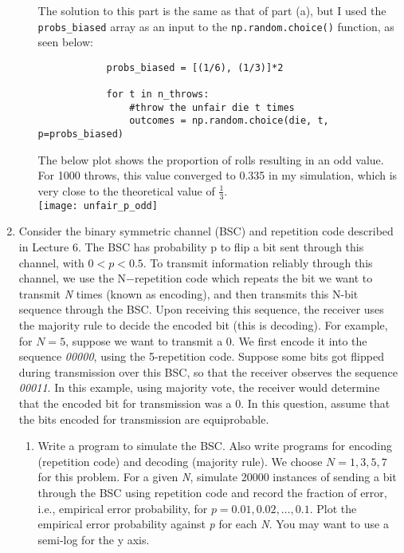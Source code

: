 \documentclass[]{article}
\begin{document}
\begin{enumerate}
\begin{enumerate}
		The solution to this part is the same as that of part (a), but I used the \texttt{probs\_biased} array as an input to the \texttt{np.random.choice()} function, as seen below:
		
		\begin{lstlisting}
			probs_biased = [(1/6), (1/3)]*2
			
			for t in n_throws:
				#throw the unfair die t times
				outcomes = np.random.choice(die, t, p=probs_biased) 
		\end{lstlisting}
	
		The below plot shows the proportion of rolls resulting in an odd value. For 1000 throws, this value converged to 0.335 in my simulation, which is very close to the theoretical value of $\frac{1}{3}$.\\
	
	    \texttt{[image: unfair\_p\_odd]}
	    
		
	\end{enumerate}

\pagebreak

\item Consider the binary symmetric channel (BSC) and repetition code described in Lecture 6. The BSC has probability p to flip a bit sent through this channel, with $ 0 < p < 0.5 $.  To transmit information reliably through this channel, we use the N−repetition code  which  repeats  the  bit  we  want  to  transmit \textit{N} times  (known  as  encoding), and then transmits this N-bit sequence through the BSC. Upon receiving this sequence, the receiver uses the majority rule to decide the encoded bit (this is decoding).  For example, for $ N = 5 $,  suppose  we  want  to  transmit  a  0.   We  first  encode  it  into  the sequence  \textit{00000},  using  the  5-repetition  code.   Suppose  some  bits  got  flipped  during transmission over this BSC, so that the receiver observes the sequence \textit{00011}.  In this example, using majority vote, the receiver would determine that the encoded bit for transmission was a 0.  In this question, assume that the bits encoded for transmission are equiprobable.

	\begin{enumerate}
		\item Write a program to simulate the BSC. Also write programs for encoding (repetition code) and decoding (majority rule).  We choose $ N = 1,3,5,7 $ for this problem.  For a given \textit{N}, simulate 20000 instances of sending a bit through the BSC using repetition code and record the fraction of error,  i.e.,  empirical error probability,  for $ p={0.01, 0.02, \ldots, 0.1} $.   Plot  the  empirical  error  probability against \textit{p} for each \textit{N}.  You may want to use a semi-log for the y axis.
		

\end{enumerate}
\end{enumerate}
\end{document}
